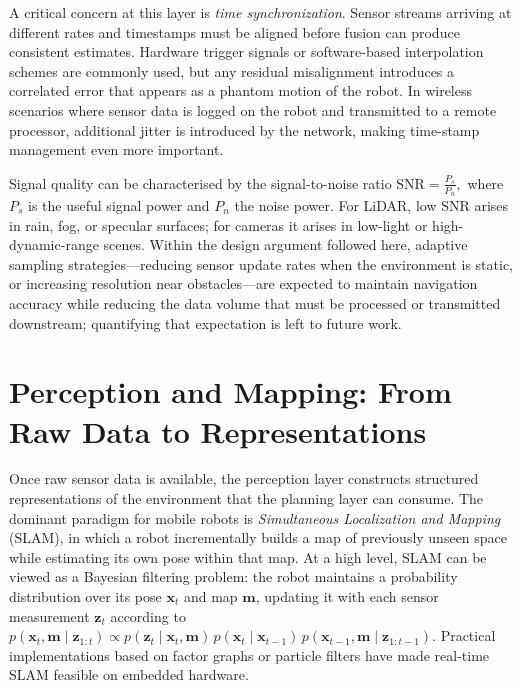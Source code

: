 A critical concern at this layer is \emph{time synchronization}.
Sensor streams arriving at different rates and timestamps must be aligned before fusion
can produce consistent estimates.
Hardware trigger signals or software-based interpolation schemes are commonly used, but
any residual misalignment introduces a correlated error that appears as a phantom motion
of the robot.
In wireless scenarios where sensor data is logged on the robot and transmitted to a
remote processor, additional jitter is introduced by the network, making time-stamp
management even more important.

Signal quality can be characterised by the signal-to-noise ratio
\(
  \text{SNR} = \frac{P_s}{P_n},
\)
where \(P_s\) is the useful signal power and \(P_n\) the noise power.
For LiDAR, low SNR arises in rain, fog, or specular surfaces; for cameras it arises in
low-light or high-dynamic-range scenes.
Within the design argument followed here, adaptive sampling strategies---reducing sensor
update rates when the environment is static, or increasing resolution near obstacles---are
expected to maintain navigation accuracy while reducing the data volume that must be
processed or transmitted downstream; quantifying that expectation is left to future work.

\section{Perception and Mapping: From Raw Data to Representations}

Once raw sensor data is available, the perception layer constructs structured
representations of the environment that the planning layer can consume.
The dominant paradigm for mobile robots is \emph{Simultaneous Localization and Mapping}
(SLAM), in which a robot incrementally builds a map of previously unseen space while
estimating its own pose within that map.
At a high level, SLAM can be viewed as a Bayesian filtering problem: the robot maintains
a probability distribution over its pose \(\mathbf{x}_t\) and map \(\mathbf{m}\),
updating it with each sensor measurement \(\mathbf{z}_t\) according to
\(
  p(\mathbf{x}_t, \mathbf{m} \mid \mathbf{z}_{1:t})
  \propto
  p(\mathbf{z}_t \mid \mathbf{x}_t, \mathbf{m})\,
  p(\mathbf{x}_t \mid \mathbf{x}_{t-1})\,
  p(\mathbf{x}_{t-1}, \mathbf{m} \mid \mathbf{z}_{1:t-1}).
\)
Practical implementations based on factor graphs or particle filters have made
real-time SLAM feasible on embedded hardware.

